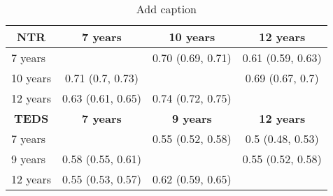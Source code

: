 \begin{table}[htbp]
  \centering
  \caption{Add caption}
    \begin{tabular}{lccr}
    \toprule
    \multicolumn{1}{c}{\textbf{NTR}} & \textbf{7 years} & \textbf{10 years} & \multicolumn{1}{c}{\textbf{12 years}} \\
    \midrule
    7 years &       & 0.70 (0.69, 0.71) & \multicolumn{1}{c}{0.61 (0.59, 0.63)} \\
    10 years & 0.71 (0.7, 0.73) &       & \multicolumn{1}{c}{0.69 (0.67, 0.7)} \\
    12 years & 0.63 (0.61, 0.65) & 0.74 (0.72, 0.75) &  \\
    \midrule
    \multicolumn{1}{c}{\textbf{TEDS}} & \textbf{7 years} & \textbf{9 years} & \multicolumn{1}{c}{\textbf{12 years}} \\
    \midrule
    7 years &       & 0.55 (0.52, 0.58) & \multicolumn{1}{c}{0.5 (0.48, 0.53)} \\
    9 years & 0.58 (0.55, 0.61) &       & \multicolumn{1}{c}{0.55 (0.52, 0.58)} \\
    12 years & 0.55 (0.53, 0.57) & 0.62 (0.59, 0.65) &  \\
    \bottomrule
    \end{tabular}%
  \label{tab:addlabel}%
\end{table}%
